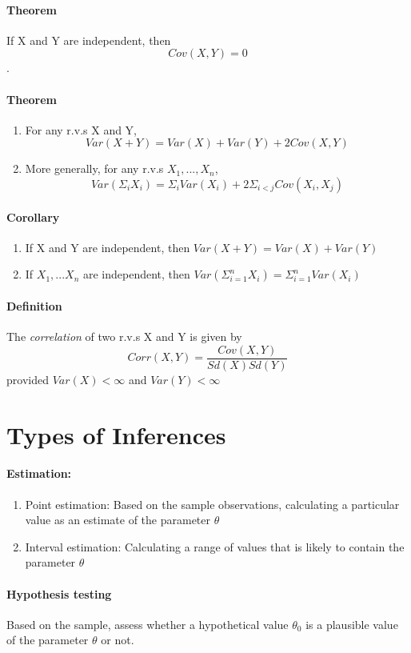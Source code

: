 \documentclass[11pt]{article}
\newcommand{\ti}[1]{\textit{#1}}
\begin{document}
\paragraph{Theorem} If X and Y are independent, then $$Cov(X,Y) = 0$$.
\paragraph{Theorem} 
\begin{enumerate}
\item For any r.v.s X and Y,
$$Var(X+Y) = Var(X) + Var(Y) + 2Cov(X,Y)$$
\item More generally, for any r.v.s $X_1,...,X_n$,$$Var(\Sigma_i X_i) = \Sigma_i Var(X_i) + 2\Sigma_{i < j}Cov(X_i,X_j)$$
\end{enumerate}
\paragraph{Corollary}
\begin{enumerate}
	\item If X and Y are independent, then $Var(X+Y) = Var(X) + Var(Y)$
	\item If $X_1,...X_n$ are independent, then $Var(\Sigma_{i=1}^n X_i) = \Sigma_{i=1}^nVar(X_i)$
\end{enumerate}
\paragraph{Definition} The \ti{correlation} of two r.v.s X and Y is given by
$$Corr(X,Y) = \frac{Cov(X,Y)}{Sd(X)Sd(Y)}$$ 
provided $Var(X) < \infty$ and $Var(Y) < \infty$
\section{Types of Inferences}
\paragraph{Estimation:}
\begin{enumerate}
	\item Point estimation: Based on the sample observations, calculating a particular value as an estimate of the parameter $\theta$
	\item Interval estimation: Calculating a range of values that is likely to contain the parameter $\theta$
\end{enumerate}
\paragraph{Hypothesis testing} Based on the sample, assess whether a hypothetical value $\theta_0$ is a plausible value of the parameter $\theta$ or not.
\end{document}
